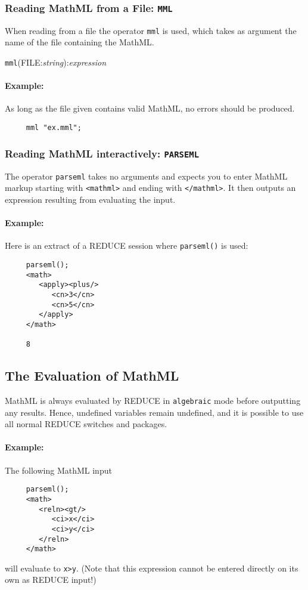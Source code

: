 \subsubsection{Reading MathML from a File: \texttt{MML}}

When reading from a file the operator \texttt{mml} is used, which takes
as argument the name of the file containing the MathML.

\texttt{mml}(FILE:\textit{string}):\textit{expression}

\paragraph{Example:}
As long as the file given contains valid MathML, no errors should be
produced.
\begin{verbatim}
     mml "ex.mml";
\end{verbatim}

\subsubsection{Reading MathML interactively: \texttt{PARSEML}}

The operator \texttt{parseml} takes no arguments and expects you to
enter MathML markup starting with \verb|<mathml>| and ending with
\verb|</mathml>|.  It then outputs an expression resulting from
evaluating the input.

\paragraph{Example:}
Here is an extract of a REDUCE session where \texttt{parseml()} is
used:
\begin{verbatim}
     parseml();
     <math>
        <apply><plus/>
           <cn>3</cn>
           <cn>5</cn>
        </apply>
     </math>

     8
\end{verbatim}

\subsection{The Evaluation of MathML}

MathML is always evaluated by REDUCE in \texttt{algebraic} mode before
outputting any results.  Hence, undefined variables remain undefined,
and it is possible to use all normal REDUCE switches and packages.

\paragraph{Example:}
The following MathML input
\begin{verbatim}
     parseml();
     <math>
        <reln><gt/>
           <ci>x</ci>
           <ci>y</ci>
        </reln>
     </math>
\end{verbatim}
will evaluate to \verb|x>y|.  (Note that this expression cannot be
entered directly on its own as REDUCE input!)

